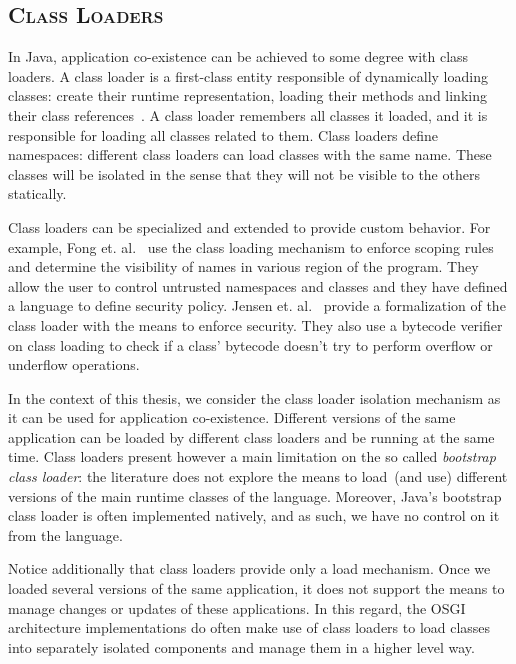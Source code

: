 
\subsection*{\textsc{Class Loaders}}
In Java, application co-existence can be achieved to some degree with class loaders. A class loader is a first-class entity responsible of dynamically loading classes: create their runtime representation, loading their methods and linking their class references~\cite{Lian98a}. A class loader remembers all classes it loaded, and it is responsible for loading all classes related to  them. Class loaders define namespaces: different class loaders can load classes with the same name. These classes will be isolated in the sense that they will not be visible to the others statically.

Class loaders can be specialized and extended to provide custom behavior. For example, Fong et. al.~\cite{Fong10a} use the class loading mechanism to enforce scoping rules and determine the visibility of names in various region of the program. They allow the user to control untrusted
namespaces and classes and they have defined a language to define security policy. Jensen et. al.~\cite{Jens98a} provide a formalization of the class loader with the means to enforce security. They also use a bytecode verifier on class loading to check if a class' bytecode doesn't try to perform overflow or underflow operations.

In the context of this thesis, we consider the class loader isolation mechanism as it can be used for application co-existence. Different versions of the same application can be loaded by different class loaders and be running at the same time. Class loaders present however a main limitation on the so called \emph{bootstrap class loader}: the literature does not explore the means to load~(and use) different versions of the main runtime classes of the language. Moreover, Java's bootstrap class loader is often implemented natively, and as such, we have no control on it from the language.

Notice additionally that class loaders provide only a load mechanism. Once we loaded several versions of the same application, it does not support the means to manage changes or updates of these applications. In this regard, the OSGI~\cite{OSGI} architecture implementations do often make use of class loaders to load classes into separately isolated components and manage them in a higher level way.

